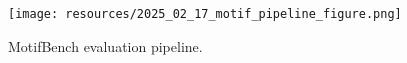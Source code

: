 \begin{figure}[ht]
    \centering
    \texttt{[image: resources/2025\_02\_17\_motif\_pipeline\_figure.png]} %
    \caption{MotifBench evaluation pipeline.}
    \label{fig:schematic} %
\end{figure}